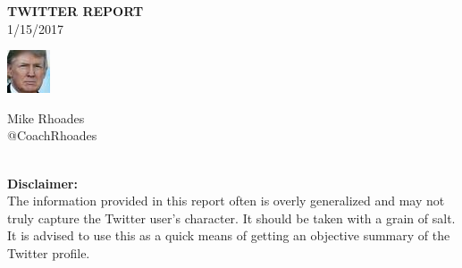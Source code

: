 \documentclass[12pt]{article}
\begin{document}
\vskip 0.3in
\begin{center}
\huge \textbf{TWITTER REPORT}\\
\small 1/15/2017\\
\end{center}
\vskip 1.0in
\begin{minipage}{0.5\textwidth}
\begin{center}
\includegraphics[width=0.8\linewidth]{prof_pic.jpg}
\end{center}
\end{minipage}
\hfill
\begin{minipage}{0.5\textwidth}\huge \noindent Mike Rhoades\\
\large @CoachRhoades\\
\large \\
\end{minipage}
\vskip 4.0in
\noindent \textbf{Disclaimer:}\\
\small The information provided in this report often is overly generalized and may not truly capture the Twitter user's character. It should be taken with a grain of salt. It is advised to use this as a quick means of getting an objective summary of the Twitter profile.
\newpage
\end{document}

